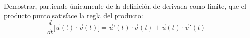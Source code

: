 Demostrar, partiendo únicamente de la definición de derivada como límite, que el producto punto satisface la regla del producto:
\[ \frac{d}{dt}\bigl[\vec{u}(t) \cdot \vec{v}(t)\bigr] = \vec{u}'(t) \cdot \vec{v}(t) + \vec{u}(t) \cdot \vec{v}'(t) \]
